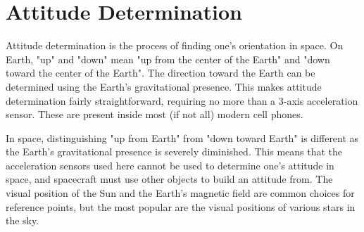 \section{Attitude Determination}\label{sec:attitudeDetermination}
Attitude determination is the process of finding one's orientation in space.
On Earth, "up" and "down" mean "up from the center of the Earth" and "down toward the center of the Earth".
The direction toward the Earth can be determined using the Earth's gravitational presence.
This makes attitude determination fairly straightforward, requiring no more than a 3-axis acceleration sensor.
These are present inside most (if not all) modern cell phones.

In space, distinguishing "up from Earth" from "down toward Earth" is different as the Earth's gravitational presence is
severely diminished.
This means that the acceleration sensors used here cannot be used to determine one's attitude in space, and
spacecraft must use other objects to build an attitude from.
The visual position of the Sun and the Earth's magnetic field are common choices for reference points, but the most
popular are the visual positions of various stars in the sky.

\begin{figure}
\end{figure}

